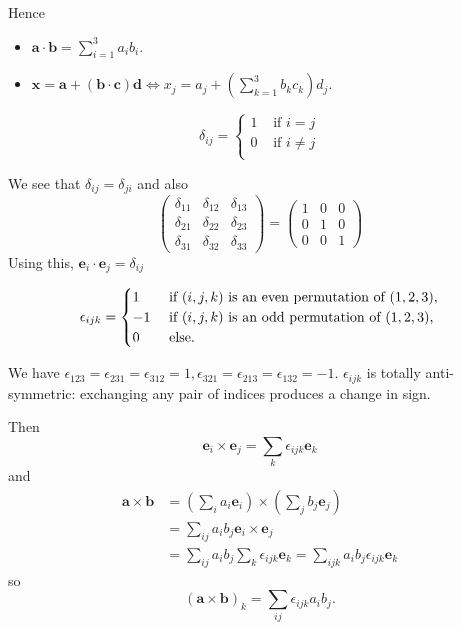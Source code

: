 \documentclass[a4paper]{article}
\begin{document}
Hence
\begin{itemize}
  \item $\displaystyle \mathbf{a}\cdot \mathbf{b} = \sum_{i=1}^{3}a_ib_i$.
  \item $\displaystyle \mathbf{x}=\mathbf{a}+(\mathbf{b}\cdot
    \mathbf{c})\mathbf{d} \Leftrightarrow x_j=a_j+\left(
    \sum_{k=1}^{3} b_kc_k \right)d_j $.
\end{itemize}
\begin{definition}
  \[
    \delta_{ij} =
    \begin{cases}
      1 &\text{ if }i=j\\
      0 &\text{ if }i\neq j\\
    \end{cases}
  \]
\end{definition}
We see that $ \delta_{ij}=\delta_{ji} $ and also
\[
  \left(
    \begin{array}{lll}
      \delta_{11} & \delta_{12} & \delta_{13} \\
      \delta_{21} & \delta_{22} & \delta_{23} \\
      \delta_{31} & \delta_{32} & \delta_{33}
  \end{array}\right)=\left(
    \begin{array}{lll}
      1 & 0 & 0 \\
      0 & 1 & 0 \\
      0 & 0 & 1
  \end{array}\right)
\]
Using this, $ \mathbf{e}_i\cdot \mathbf{e}_j=\delta_{ij} $
\begin{definition}
  \[
    \epsilon_{ijk}=
    \begin{cases}
      1 &\text{ if $ (i,j,k) $ is an even permutation of $ (1,2,3) $,}\\
      -1 &\text{ if $ (i,j,k) $ is an odd permutation of $ (1,2,3) $,}\\
      0 &\text{ else.}\\
    \end{cases}
  \]
\end{definition}
We have $ \epsilon_{123}=\epsilon_{231}=\epsilon_{312}=1,
\epsilon_{321}=\epsilon_{213}=\epsilon_{132}=-1 $.
$ \epsilon_{ijk} $ is totally anti-symmetric: exchanging any pair of
indices produces a change in sign.

Then
\[
  \mathbf{e}_i \times \mathbf{e}_j = \sum_{k}\epsilon_{ijk}\mathbf{e}_k
\]
and
\[
  \begin{aligned}
    \mathbf{a} \times \mathbf{b}&= \left( \sum_{i} a_i \mathbf{e}_i
    \right)\times \left( \sum_{j} b_j \mathbf{e}_j \right)\\
    &= \sum_{ij}a_ib_j \mathbf{e}_i \times \mathbf{e}_j\\
    &=
    \sum_{ij}a_ib_j\sum_{k}\epsilon_{ijk}\mathbf{e}_k=\sum_{ijk}a_ib_j\epsilon_{ijk}\mathbf{e}_k
  \end{aligned}
\]
so
\[
  \boxed{(\mathbf{a}\times \mathbf{b})_k=\sum_{ij}\epsilon_{ijk}a_ib_j}
.\]
\end{document}
